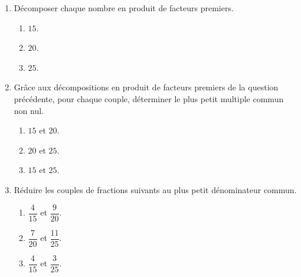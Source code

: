 \begin{exercice*}
    \begin{enumerate}
        \item Décomposer chaque nombre en produit de facteurs premiers.
        \begin{multicols}{3}
            \begin{enumerate}
                \item $15$.
                \item $20$.
                \item $25$.
            \end{enumerate}
        \end{multicols}
        \item Grâce aux décompositions en produit de facteurs premiers de la question précédente, pour chaque couple, déterminer le plus petit multiple commun non nul.
        \begin{multicols}{3}
            \begin{enumerate}
                \item $15$ et $20$.
                \item $20$ et $25$.
                \item $15$ et $25$.
            \end{enumerate}           
        \end{multicols}
        \item Réduire les couples de fractions suivants au plus petit dénominateur commun.
        \begin{multicols}{3}
            \begin{enumerate}
                \item $\dfrac{4}{15}$ et $\dfrac{9}{20}$.
                \item $\dfrac{7}{20}$ et $\dfrac{11}{25}$.
                \item $\dfrac{4}{15}$ et $\dfrac{3}{25}$.
            \end{enumerate}
        \end{multicols}
    \end{enumerate}
\end{exercice*}
